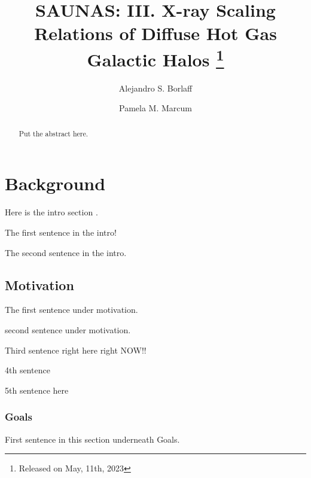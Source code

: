 \documentclass[modern]{aastex631}
\begin{document}
\title{\textbf{SAUNAS}: III. X-ray Scaling Relations of Diffuse Hot Gas Galactic Halos \footnote{Released on May, 11th, 2023}}
\author{Alejandro S. Borlaff}
\author{Pamela M. Marcum}

\begin{abstract}
Put the abstract here. 
\end{abstract}

\section{Background}
Here is the intro section \citep{aguerri+1998aj116_2136, bell+2006apj640_241,bell+2006apj652_270}. 

The first sentence in the intro! 

The second sentence in the intro.

\subsection{Motivation}

The first sentence under motivation.

second sentence under motivation.

Third sentence right here right NOW!! 

4th sentence 

5th sentence here 

\subsubsection{Goals}
First sentence in this section underneath Goals. 

\begin{acknowledgements}

\end{acknowledgements}
\vspace{5mm}


% 
 

\end{document}
